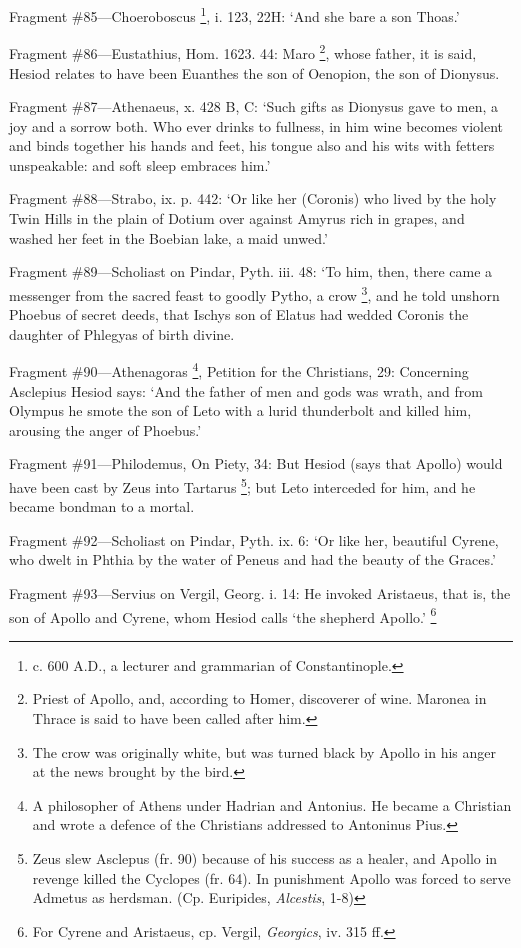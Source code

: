 Fragment \#85—Choeroboscus \footnote{c. 600 A.D., a lecturer
and grammarian of Constantinople.}, i. 123,
22H: ‘And she bare a son Thoas.’

Fragment \#86—Eustathius, Hom. 1623. 44: Maro \footnote{Priest of Apollo, and,
according to Homer, discoverer of wine. Maronea in Thrace is said to have been
called after him.}, whose
father, it is said, Hesiod relates to have been Euanthes the son of Oenopion,
the son of Dionysus.

Fragment \#87—Athenaeus, x. 428 B, C: ‘Such gifts as Dionysus gave
to men, a joy and a sorrow both. Who ever drinks to fullness, in him wine
becomes violent and binds together his hands and feet, his tongue also and his
wits with fetters unspeakable: and soft sleep embraces him.’

Fragment \#88—Strabo, ix. p. 442: ‘Or like her (Coronis) who lived
by the holy Twin Hills in the plain of Dotium over against Amyrus rich in
grapes, and washed her feet in the Boebian lake, a maid unwed.’

Fragment \#89—Scholiast on Pindar, Pyth. iii. 48: ‘To him, then,
there came a messenger from the sacred feast to goodly Pytho, a crow \footnote{The crow was originally
white, but was turned black by Apollo in his anger at the news brought by the
bird.}, and he told unshorn Phoebus of
secret deeds, that Ischys son of Elatus had wedded Coronis the daughter of
Phlegyas of birth divine.

Fragment \#90—Athenagoras \footnote{A philosopher of Athens
under Hadrian and Antonius. He became a Christian and wrote a defence of the
Christians addressed to Antoninus Pius.}, Petition for the Christians, 29:
Concerning Asclepius Hesiod says: ‘And the father of men and gods was
wrath, and from Olympus he smote the son of Leto with a lurid thunderbolt and
killed him, arousing the anger of Phoebus.’

Fragment \#91—Philodemus, On Piety, 34: But Hesiod (says that Apollo)
would have been cast by Zeus into Tartarus \footnote{Zeus slew Asclepus (fr.
90) because of his success as a healer, and Apollo in revenge killed the
Cyclopes (fr. 64). In punishment Apollo was forced to serve Admetus as
herdsman. (Cp. Euripides, \emph{Alcestis}, 1-8)}; but Leto
interceded for him, and he became bondman to a mortal.

Fragment \#92—Scholiast on Pindar, Pyth. ix. 6: ‘Or like her,
beautiful Cyrene, who dwelt in Phthia by the water of Peneus and had the beauty
of the Graces.’

Fragment \#93—Servius on Vergil, Georg. i. 14: He invoked Aristaeus, that
is, the son of Apollo and Cyrene, whom Hesiod calls ‘the shepherd
Apollo.’ \footnote{For Cyrene and Aristaeus,
cp. Vergil, \emph{Georgics}, iv. 315 ff.}

